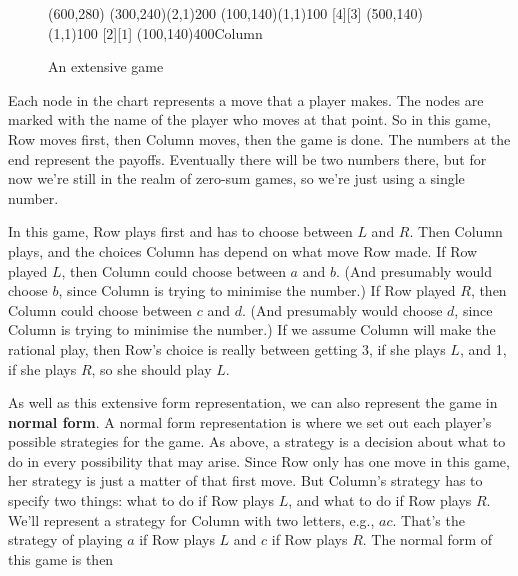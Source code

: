 \begin{figure}[htb] 
\hspace*{\fill} 
\begin{egame}(600,280) 
% 
\putbranch(300,240)(2,1){200}
% 
% 
\putbranch(100,140)(1,1){100} 
% 
[$4$][$3$] 
% 
\putbranch(500,140)(1,1){100} 
% 
[$2$][$1$] 
% 
\infoset(100,140){400}{Column} 
% 
\end{egame} 
\hspace*{\fill} 
\caption[]{An extensive game}
\label{f:one} 
\end{figure} 
Each node in the chart represents a move that a player makes. The nodes are marked with the name of the player who moves at that point. So in this game, Row moves first, then Column moves, then the game is done. The numbers at the end represent the payoffs. Eventually there will be two numbers there, but for now we're still in the realm of zero-sum games, so we're just using a single number.

In this game, Row plays first and has to choose between $L$ and $R$. Then Column plays, and the choices Column has depend on what move Row made. If Row played $L$, then Column could choose between $a$ and $b$. (And presumably would choose $b$, since Column is trying to minimise the number.) If Row played $R$, then Column could choose between $c$ and $d$. (And presumably would choose $d$, since Column is trying to minimise the number.) If we assume Column will make the rational play, then Row's choice is really between getting 3, if she plays $L$, and 1, if she plays $R$, so she should play $L$.

As well as this extensive form representation, we can also represent the game in \textbf{normal form}. A normal form representation is where we set out each player's possible strategies for the game. As above, a strategy is a decision about what to do in every possibility that may arise. Since Row only has one move in this game, her strategy is just a matter of that first move. But Column's strategy has to specify two things: what to do if Row plays $L$, and what to do if Row plays $R$. We'll represent a strategy for Column with two letters, e.g., $ac$. That's the strategy of playing $a$ if Row plays $L$ and $c$ if Row plays $R$. The normal form of this game is then

